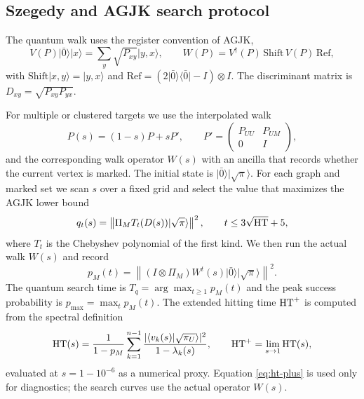 \subsection{Szegedy and AGJK search protocol}
\label{sec:methods-szegedy}

The quantum walk uses the register convention of AGJK,
\begin{equation}
  V(P)\lvert\bar 0\rangle\lvert x\rangle
  =\sum_y\sqrt{P_{xy}}\lvert y,x\rangle,\qquad
  W(P)=V^\dagger(P)\,\mathrm{Shift}\,V(P)\,\mathrm{Ref},
\end{equation}
with $\mathrm{Shift}\lvert x,y\rangle=\lvert y,x\rangle$ and
$\mathrm{Ref}=(2\lvert\bar 0\rangle\langle\bar 0\rvert-I)\otimes I$. The
discriminant matrix is $D_{xy}=\sqrt{P_{xy}P_{yx}}$.

For multiple or clustered targets we use the interpolated walk
\begin{equation}
  P(s)=(1-s)P+sP',\qquad
  P'=\begin{pmatrix}P_{UU}&P_{UM}\\0&I\end{pmatrix},
  \label{eq:interpolated}
\end{equation}
and the corresponding walk operator $W(s)$ with an ancilla that records whether
the current vertex is marked. The initial state is
$\lvert\bar 0\rangle\lvert\sqrt{\pi}\rangle$. For each graph and marked set we
scan $s$ over a fixed grid and select the value that maximizes the AGJK lower
bound
\begin{equation}
  q_t(s)=\left\lVert\Pi_M T_t(D(s))\lvert\sqrt{\pi}\rangle\right\rVert^2,
  \qquad t\le 3\sqrt{\mathrm{HT}}+5,
  \label{eq:lower-bound}
\end{equation}
where $T_t$ is the Chebyshev polynomial of the first kind. We then run the
actual walk $W(s)$ and record
\begin{equation}
  p_M(t)=\left\lVert(I\otimes\Pi_M)W^t(s)\lvert\bar 0\rangle
  \lvert\sqrt{\pi}\rangle\right\rVert^2.
\end{equation}
The quantum search time is $T_q=\arg\max_{t\ge1}p_M(t)$ and the peak success
probability is $p_{\max}=\max_t p_M(t)$. The extended hitting time $\mathrm{HT}^+$ is
computed from the spectral definition
\begin{equation}
  \mathrm{HT}(s)=\frac{1}{1-p_M}\sum_{k=1}^{n-1}
  \frac{\lvert\langle v_k(s)\rvert\sqrt{\pi_U}\rangle\rvert^2}{1-\lambda_k(s)},
  \qquad
  \mathrm{HT}^+=\lim_{s\to1}\mathrm{HT}(s),
  \label{eq:ht-plus}
\end{equation}
evaluated at $s=1-10^{-6}$ as a numerical proxy. Equation
\eqref{eq:ht-plus} is used only for diagnostics; the search curves use the
actual operator $W(s)$.

